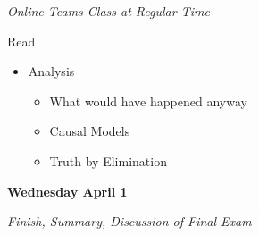 \documentclass[
]{article}
\begin{document}
\emph{Online Teams Class at Regular Time}

Read

\begin{itemize}
\item
  Analysis

  \begin{itemize}
  \item
    What would have happened anyway
  \item
    Causal Models
  \item
    Truth by Elimination
  \end{itemize}
\end{itemize}

\textbf{Wednesday April 1}

\emph{Finish, Summary, Discussion of Final Exam}
\end{document}
